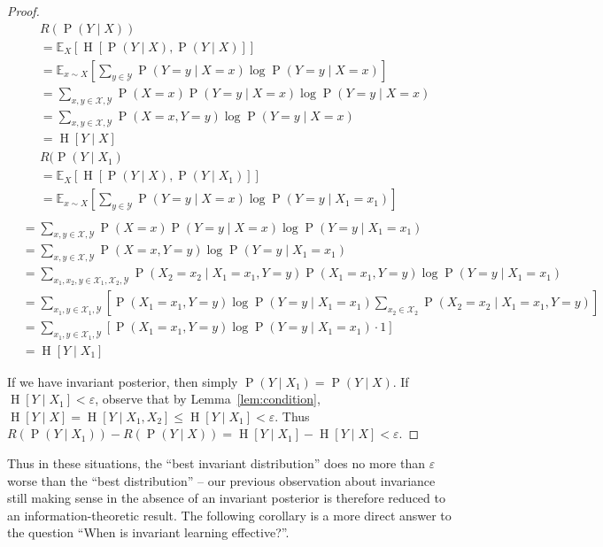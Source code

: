 \documentclass[12pt]{article}
\newcommand{\Ent}[1]{\operatorname{H}\left[#1\right]}
\newcommand{\E}[2][{}]{\mathbb{E}_{#1}\left[#2\right]}
\newcommand{\Prob}[1]{\operatorname{P}\left(#1\right)}
\theoremstyle{definition}
\numberwithin{equation}{section}
\numberwithin{figure}{section}
\numberwithin{table}{section}
\begin{document}
\begin{proof}
    \begin{align*}
        & R(\Prob{Y\mid X})\\
        &= \E[X]{\Ent{\Prob{Y\mid X}, \Prob{Y\mid X}}} \\
        &= \E[x\sim X]{\sum_{y\in\mathcal{Y}}{\Prob{Y=y\mid X=x}\log\Prob{Y=y\mid X=x}}} \\ 
        &= \sum_{x,y\in\mathcal{X}, \mathcal{Y}}{\Prob{X=x}\Prob{Y=y\mid X=x}\log\Prob{Y=y\mid X=x}} \\ 
        &=\sum_{x,y\in\mathcal{X}, \mathcal{Y}}{\Prob{X=x,Y=y}\log\Prob{Y=y\mid X=x}} \\
        &= \Ent{Y\mid X} \\
        & R(\Prob{Y\mid X_1} \\
        &= \E[X]{\Ent{\Prob{Y\mid X}, \Prob{Y\mid X_1}}} \\
        &= \E[x\sim X]{\sum_{y\in \mathcal{Y}}{\Prob{Y=y\mid X=x}}\log\Prob{Y=y\mid X_1=x_1}} \\
    \end{align*}
    \begin{align*}
        &= \sum_{x,y\in\mathcal{X},\mathcal{Y}}{\Prob{X=x}\Prob{Y=y\mid X=x}\log\Prob{Y=y\mid X_1=x_1}} \\
        &= \sum_{x,y\in\mathcal{X},\mathcal{Y}}{\Prob{X=x,Y=y}\log\Prob{Y=y\mid X_1=x_1}} \\
        &= \sum_{x_1,x_2,y\in\mathcal{X}_1,\mathcal{X}_2,\mathcal{Y}}{\Prob{X_2=x_2\mid X_1=x_1, Y=y}\Prob{X_1=x_1,Y=y}\log\Prob{Y=y\mid X_1=x_1}} \\
        &= \sum_{x_1, y\in\mathcal{X}_1,\mathcal{Y}}{\left[\Prob{X_1=x_1, Y=y}\log\Prob{Y=y\mid X_1=x_1}\sum_{x_2\in\mathcal{X}_2}{\Prob{X_2=x_2\mid X_1=x_1, Y=y}}\right]} \\ 
        &= \sum_{x_1, y\in\mathcal{X}_1,\mathcal{Y}}{\left[\Prob{X_1=x_1, Y=y}\log\Prob{Y=y\mid X_1=x_1}\cdot 1\right]}\\
        &= \Ent{Y\mid X_1}
    \end{align*}
    
    If we have invariant posterior, then simply $\Prob{Y\mid X_1}=\Prob{Y\mid X}$. If $\Ent{Y\mid X_1}<\varepsilon$, observe that by Lemma~\ref{lem:condition}, $\Ent{Y\mid X} = \Ent{Y\mid X_1, X_2} \le \Ent{Y\mid X_1} < \varepsilon$. Thus $R(\Prob{Y\mid X_1})-R(\Prob{Y\mid X})= \Ent{Y\mid X_1} - \Ent{Y\mid X}<\varepsilon$.
\end{proof}

Thus in these situations, the ``best invariant distribution'' does no more than $\varepsilon$ worse than the ``best distribution'' -- our previous observation about invariance still making sense in the absence of an invariant posterior is therefore reduced to an information-theoretic result. The following corollary is a more direct answer to the question ``When is invariant learning effective?''.
\end{document}
